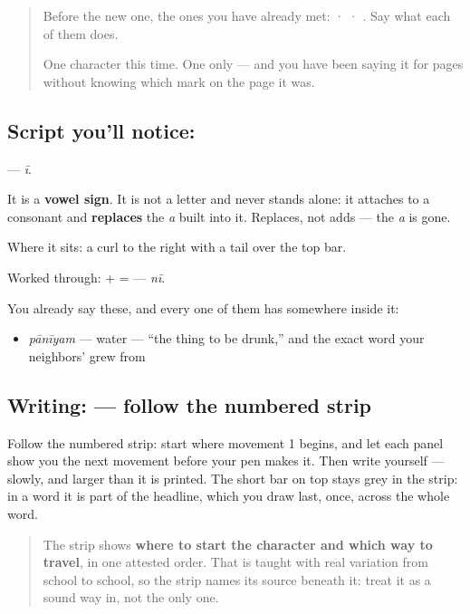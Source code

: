 \label{lesson:SA-S210-vowel-sign-ii}



\begin{quote}
Before the new one, the ones you have already met:  ·  · . Say what each of them does.

One character this time. One only — and you have been saying it for pages without knowing which mark on the page it was.
\end{quote}

\subsection*{Script you'll notice: }
\textbf{} — \emph{ī}.

It is a \textbf{vowel sign}. It is not a letter and never stands alone: it attaches to a consonant and \textbf{replaces} the \emph{a} built into it. Replaces, not adds — the \emph{a} is gone.

Where it sits: a curl to the right with a tail over the top bar.

Worked through: \textbf{} + \textbf{} = \textbf{} — \emph{nī}.

You already say these, and every one of them has  somewhere inside it:

\begin{itemize}
\raggedright
  \item \textbf{} \emph{pānīyam} — water — \textquotedblleft{}the thing to be drunk,\textquotedblright{} and the exact word your neighbors'  grew from
\end{itemize}

\subsection*{Writing:  — follow the numbered strip}

Follow the numbered strip: start where movement 1 begins, and let each panel show you the next movement before your pen makes it. Then write  yourself — slowly, and larger than it is printed. The short bar on top stays grey in the strip: in a word it is part of the headline, which you draw last, once, across the whole word.

\begin{quote}
The strip shows \textbf{where to start the character and which way to travel}, in one attested order. That is taught with real variation from school to school, so the strip names its source beneath it: treat it as a sound way in, not the only one.
\end{quote}


